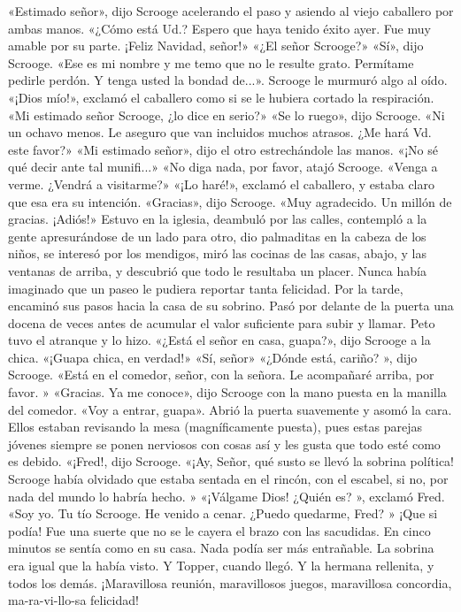\documentclass{novela}
\begin{document}
 «Estimado señor», dijo Scrooge acelerando el paso y asiendo al viejo caballero por ambas manos. «¿Cómo está Ud.? Espero que haya tenido éxito ayer. Fue muy amable por su parte. ¡Feliz Navidad, señor!»
 «¿El señor Scrooge?»
 «Sí», dijo Scrooge. «Ese es mi nombre y me temo que no le resulte grato. Permítame pedirle perdón. Y tenga usted la bondad de...». Scrooge le murmuró algo al oído.
 «¡Dios mío!», exclamó el caballero como si se le hubiera cortado la respiración. «Mi estimado señor Scrooge, ¿lo dice en serio?»
 «Se lo ruego», dijo Scrooge. «Ni un ochavo menos. Le aseguro que van incluidos muchos atrasos. ¿Me hará Vd. este favor?»
 «Mi estimado señor», dijo el otro estrechándole las manos. «¡No sé qué decir ante tal munifi...»
 «No diga nada, por favor, atajó Scrooge. «Venga a verme. ¿Vendrá a visitarme?»
 «¡Lo haré!», exclamó el caballero, y estaba claro que esa era su intención.
 «Gracias», dijo Scrooge. «Muy agradecido. Un millón de gracias. ¡Adiós!»
 Estuvo en la iglesia, deambuló por las calles, contempló a la gente apresurándose de un lado para otro, dio palmaditas en la cabeza de los niños, se interesó por los mendigos, miró las cocinas de las casas, abajo, y las ventanas de arriba, y descubrió que todo le resultaba un placer. Nunca había imaginado que un paseo le pudiera reportar tanta felicidad. Por la tarde, encaminó sus pasos hacia la casa de su sobrino.
 Pasó por delante de la puerta una docena de veces antes de acumular el valor suficiente para subir y llamar. Peto tuvo el atranque y lo hizo.
 «¿Está el señor en casa, guapa?», dijo Scrooge a la chica. «¡Guapa chica, en verdad!»
 «Sí, señor»
 «¿Dónde está, cariño? », dijo Scrooge.
 «Está en el comedor, señor, con la señora. Le acompañaré arriba, por favor. »
 «Gracias. Ya me conoce», dijo Scrooge con la mano puesta en la manilla del comedor. «Voy a entrar, guapa».
 Abrió la puerta suavemente y asomó la cara. Ellos estaban revisando la mesa (magníficamente puesta), pues estas parejas jóvenes siempre se ponen nerviosos con cosas así y les gusta que todo esté como es debido.
 «¡Fred!, dijo Scrooge.
 «¡Ay, Señor, qué susto se llevó la sobrina política! Scrooge había olvidado que estaba sentada en el rincón, con el escabel, si no, por nada del mundo lo habría hecho. »
 «¡Válgame Dios! ¿Quién es? », exclamó Fred.
 «Soy yo. Tu tío Scrooge. He venido a cenar. ¿Puedo quedarme, Fred? »
 ¡Que si podía! Fue una suerte que no se le cayera el brazo con las sacudidas. En cinco minutos se sentía como en su casa. Nada podía ser más entrañable. La sobrina era igual que la había visto. Y Topper, cuando llegó. Y la hermana rellenita, y todos los demás. ¡Maravillosa reunión, maravillosos juegos, maravillosa concordia, ma-ra-vi-llo-sa felicidad!
\end{document}
